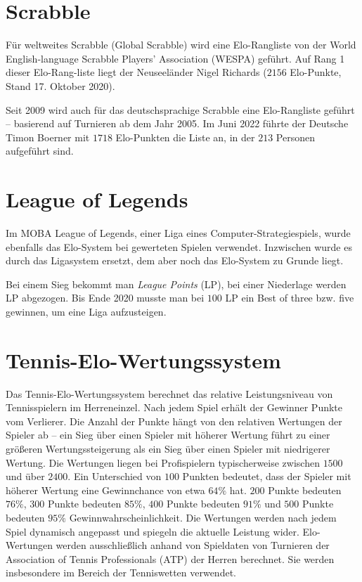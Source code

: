 \section{Scrabble}

Für weltweites Scrabble (Global Scrabble) wird eine Elo-Rangliste von der World English-language Scrabble Players' Association (WESPA) geführt. Auf Rang 1 dieser Elo-Rang-liste liegt der Neuseeländer Nigel Richards ($2156$ Elo-Punkte, Stand 17. Oktober 2020).

Seit 2009 wird auch für das deutschsprachige Scrabble eine Elo-Rangliste geführt -- basierend auf Turnieren ab dem Jahr 2005. Im Juni 2022 führte der Deutsche Timon Boerner mit $1718$ Elo-Punkten die Liste an, in der $213$ Personen aufgeführt sind.


\section{League of Legends}

Im MOBA League of Legends, einer Liga eines Computer-Strategiespiels, wurde ebenfalls das Elo-System bei gewerteten Spielen verwendet. Inzwischen wurde es durch das Ligasystem ersetzt, dem aber noch das Elo-System zu Grunde liegt.

Bei einem Sieg bekommt man \textit{League Points} (LP), bei einer Niederlage werden LP abgezogen. Bis Ende 2020 musste man bei $100$ LP ein Best of three bzw. five gewinnen, um eine Liga aufzusteigen.


\section{Tennis-Elo-Wertungssystem}

Das Tennis-Elo-Wertungssystem berechnet das relative Leistungsniveau von Tennisspielern im Herreneinzel. Nach jedem Spiel erhält der Gewinner Punkte vom Verlierer. Die Anzahl der Punkte hängt von den relativen Wertungen der Spieler ab -- ein Sieg über einen Spieler mit höherer Wertung führt zu einer größeren Wertungssteigerung als ein Sieg über einen Spieler mit niedrigerer Wertung. Die Wertungen liegen bei Profispielern typischerweise zwischen $1500$ und über $2400$. Ein Unterschied von $100$ Punkten bedeutet, dass der Spieler mit höherer Wertung eine Gewinnchance von etwa $64 \%$ hat. $200$ Punkte bedeuten $76 \%$, $300$ Punkte bedeuten $85 \%$, $400$ Punkte bedeuten $91 \%$ und $500$ Punkte bedeuten $95 \%$ Gewinnwahrscheinlichkeit. Die Wertungen werden nach jedem Spiel dynamisch angepasst und spiegeln die aktuelle Leistung wider. Elo-Wertungen werden ausschließlich anhand von Spieldaten von Turnieren der Association of Tennis Professionals (ATP) der Herren berechnet. Sie werden insbesondere im Bereich der Tenniswetten verwendet.
